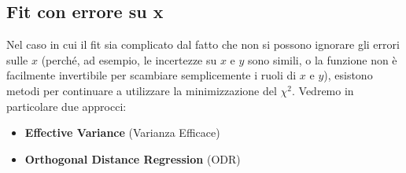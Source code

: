 \documentclass[openany,a4paper,12pt]{book}
\theoremstyle{remark}
\begin{document}
\subsection*{Fit con errore su x}
Nel caso in cui il fit sia complicato dal fatto che non si possono ignorare gli errori sulle $x$ (perché, ad esempio, le incertezze su $x$ e $y$ sono simili, o la funzione non è facilmente invertibile per scambiare semplicemente i ruoli di $x$ e $y$), esistono metodi per continuare a utilizzare la minimizzazione del $\chi^2$. Vedremo in particolare due approcci:
\begin{itemize}
    \item \textbf{Effective Variance} (Varianza Efficace)
    \item \textbf{Orthogonal Distance Regression} (ODR)
\end{itemize}
\end{document}

